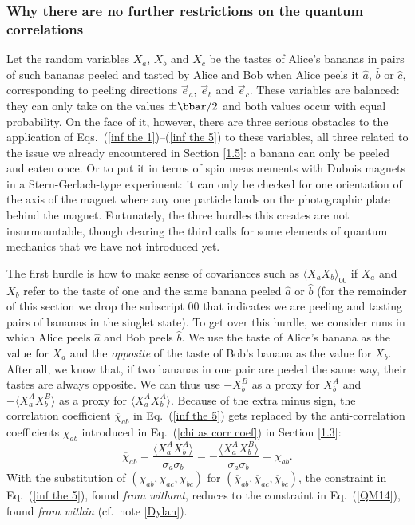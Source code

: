 \subsubsection{Why there are no further restrictions on the quantum correlations} \label{1.6.2}

Let the random variables $X_a$, $X_b$ and $X_c$ be the tastes of Alice's bananas in pairs of such bananas peeled and tasted by Alice and Bob when Alice peels it $\hat{a}$, $\hat{b}$ or $\hat{c}$, corresponding to peeling directions $\vec{e}_a$, $\vec{e}_b$ and $\vec{e}_c$.  These variables are balanced: they can only take on the values $\pm \bbar/2$ and both values occur with equal probability. On the face of it, however, there are three serious obstacles to the application of Eqs.\ (\ref{inf the 1})--(\ref{inf the 5}) to these variables, all three related to the issue we already encountered in Section \ref{1.5}: a banana can only be peeled and eaten once. Or to put it in terms of spin measurements with Dubois magnets in a Stern-Gerlach-type experiment: it can only be checked for one orientation of the axis of the magnet where any one particle lands on the photographic plate behind the magnet. Fortunately, the three hurdles this creates are not insurmountable, though clearing the third calls for some elements of quantum mechanics that we have not introduced yet.  

The first hurdle is how to make sense of covariances such as $\langle X_a X_b \rangle_{00}$ if $X_a$ and $X_b$ refer to the taste of one and the same banana peeled $\hat{a}$ or $\hat{b}$ (for the remainder of this section we drop the subscript $00$ that indicates we are peeling and tasting pairs of bananas in the singlet state). To get over this hurdle, we consider runs in which Alice peels $\hat{a}$ and Bob peels $\hat{b}$. We use the taste of Alice's banana as the value for $X_a$ and the \emph{opposite} of the taste of Bob's banana as the value for $X_b$. After all, we know that, if two bananas in one pair are peeled the same way, their tastes are always opposite. We can thus use $-X_b^B$ as a proxy for $X_b^A$ and $- \langle X_a^A X_b^B \rangle$ as a proxy for $\langle X_a^A X_b^A \rangle$. Because of the extra minus sign, the correlation coefficient $ \overline{\chi}_{ab}$ in Eq.\ (\ref{inf the 5}) gets replaced by the anti-correlation coefficients $\chi_{ab}$ introduced in Eq.\ (\ref{chi as corr coef}) in Section \ref{1.3}:   
\begin{equation}
 \overline{\chi}_{ab} = \frac{\langle X^A_a X^A_b \rangle}{\sigma_a \sigma_b} = - \frac{\langle X^A_a X^B_b \rangle}{\sigma_a \sigma_b} = \chi_{ab}.
 \label{chi 4 bar-chi}
\end{equation}
With the substitution of $(\chi_{ab}, \chi_{ac}, \chi_{bc})$ for $(\overline{\chi}_{ab}, \overline{\chi}_{ac},  \overline{\chi}_{bc})$, the constraint in Eq.\ (\ref{inf the 5}), found \emph{from without}, reduces to the constraint in Eq.\ (\ref{QM14}), found \emph{from within} (cf.\ note \ref{Dylan}).

